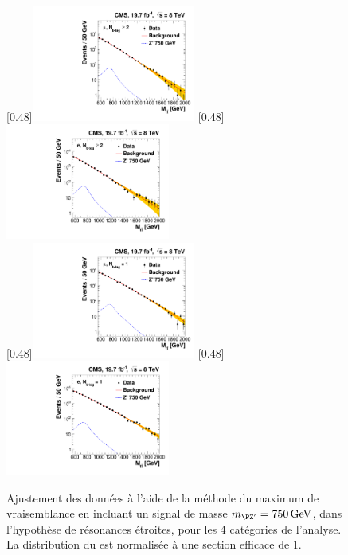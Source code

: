 \begin{figure}[tbp] \centering
    [0.48\textwidth]{\includegraphics[width=0.48\textwidth,angle=-90,origin=c]{chapitre7/figs/likelihood_fit_mu_2b.pdf}} \hfill
    [0.48\textwidth]{\includegraphics[width=0.48\textwidth,angle=-90,origin=c]{chapitre7/figs/likelihood_fit_e_2b.pdf}} \\
    [0.48\textwidth]{\includegraphics[width=0.48\textwidth,angle=-90,origin=c]{chapitre7/figs/likelihood_fit_mu_1b.pdf}} \hfill
    [0.48\textwidth]{\includegraphics[width=0.48\textwidth,angle=-90,origin=c]{chapitre7/figs/likelihood_fit_e_1b.pdf}}
    \caption{Ajustement des données à l'aide de la méthode du maximum de vraisemblance en incluant un signal de masse $\mzp = \SI{750}{\GeV}$, dans l'hypothèse de résonances étroites, pour les 4 catégories de l'analyse. La distribution du \zprime est normalisée à une section efficace de \SI{1}{\pb}.}
    \label{fig:likelihood_fit}
\end{figure}


